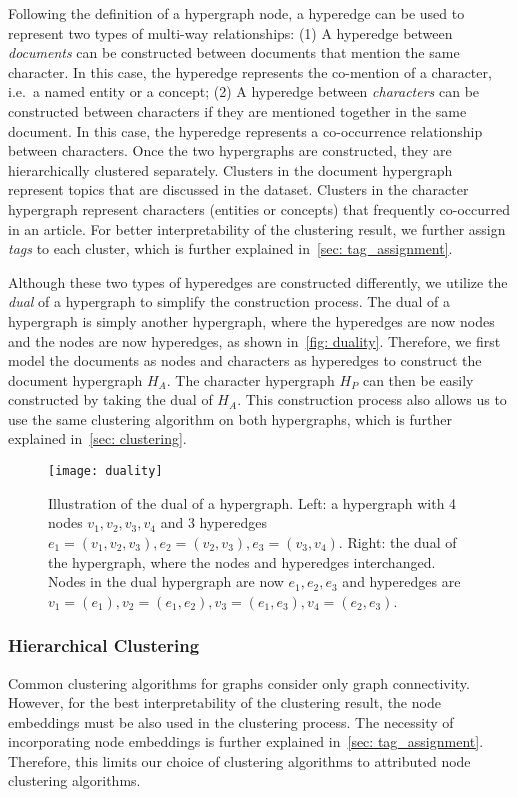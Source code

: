 Following the definition of a hypergraph node, a hyperedge can be used to represent two types of multi-way relationships:
(1) A hyperedge between \textit{documents} can be constructed between documents that mention the same character. 
In this case, the hyperedge represents the co-mention of a character, i.e.\ a named entity or a concept;
(2) A hyperedge between \textit{characters} can be constructed between characters if they are mentioned together in the same document.
In this case, the hyperedge represents a co-occurrence relationship between characters.
Once the two hypergraphs are constructed, they are hierarchically clustered separately.
Clusters in the document hypergraph represent topics that are discussed in the dataset.
Clusters in the character hypergraph represent characters (entities or concepts) that frequently co-occurred in an article.
For better interpretability of the clustering result, we further assign \textit{tags} to each cluster, which is further explained in~\autoref{sec: tag_assignment}.

Although these two types of hyperedges are constructed differently, we utilize the \textit{dual} of a hypergraph to simplify the construction process.
The dual of a hypergraph is simply another hypergraph, where the hyperedges are now nodes and the nodes are now hyperedges, as shown in~\autoref{fig: duality}.
Therefore, we first model the documents as nodes and characters as hyperedges to construct the document hypergraph $H_A$.
The character hypergraph $H_P$ can then be easily constructed by taking the dual of $H_A$.
This construction process also allows us to use the same clustering algorithm on both hypergraphs, which is further explained in~\autoref{sec: clustering}.

\begin{figure}
 \centering %
 \texttt{[image: duality]}
 \caption{Illustration of the dual of a hypergraph. 
 Left: a hypergraph with 4 nodes $v_1, v_2, v_3, v_4$ and 3 hyperedges $e_1=(v_1, v_2, v_3), e_2=(v_2, v_3), e_3=(v_3, v_4)$. 
 Right: the dual of the hypergraph, where the nodes and hyperedges interchanged.
 Nodes in the dual hypergraph are now $e_1, e_2, e_3$ and hyperedges are $v_1=(e_1), v_2=(e_1, e_2), v_3=(e_1, e_3), v_4=(e_2, e_3)$.
 }
\label{fig: duality}
\end{figure}

\subsubsection{Hierarchical Clustering}\label{sec: clustering}
Common clustering algorithms for graphs consider only graph connectivity.
However, for the best interpretability of the clustering result, the node embeddings must be also used in the clustering process.
The necessity of incorporating node embeddings is further explained in~\autoref{sec: tag_assignment}.
Therefore, this limits our choice of clustering algorithms to attributed node clustering algorithms.

